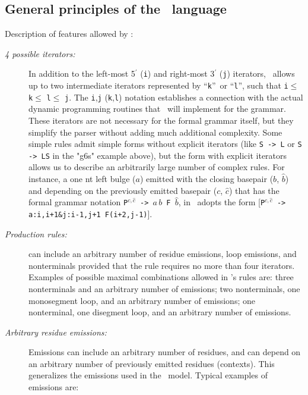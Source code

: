 \subsection{General principles of the \tornado\, language}
Description of features allowed by \tornado:
%
\begin{description}

\item[\textsl{4 possible iterators:}] In addition to the left-most
  5$^\prime$ (\texttt{i}) and right-most 3$^\prime$ (\texttt{j})
  iterators, \tornado\, allows up to two intermediate iterators
  represented by ``\texttt{k}''\, or ``\texttt{l}'', such that
  \texttt{i}$\leq$ \texttt{k}$\leq$ \texttt{l}$\leq$ \texttt{j}.  The
  \texttt{i},\texttt{j} (\texttt{k},\texttt{l}) notation establishes a
  connection with the actual dynamic programming routines that
  \tornado\, will implement for the grammar. These iterators are not
  necessary for the formal grammar itself, but they simplify the
  parser without adding much additional complexity. Some simple rules
  admit simple forms without explicit iterators (like \texttt{S -> L}
  or \texttt{S -> LS} in the "g6s" example above), but the form with
  explicit iterators allows us to describe an arbitrarily large number
  of complex rules. For instance, a one nt left bulge ($a$) emitted
  with the closing basepair ($b$, $\hat b$) and depending on the
  previously emitted basepair ($c$, $\hat c$) that has the formal
  grammar notation \texttt{P$^{c, \hat c}$ -> $a\, b$ F $\hat b$}, in
  \tornado\, adopts the form [\texttt{P$^{c, \hat c}$ ->
      a:i,i+1\&j:i-1,j+1 F(i+2,j-1)}].

\item[\textsl{Production rules:}] can include an arbitrary number of
  residue emissions, loop emissions, and nonterminals provided that
  the rule requires no more than four iterators. Examples of possible
  maximal combinations allowed in \tornado's rules are: three
  nonterminals and an arbitrary number of emissions; two nonterminals,
  one monosegment loop, and an arbitrary number of emissions; one
  nonterminal, one disegment loop, and an arbitrary number of
  emissions.

\item[\textsl{Arbitrary residue emissions:}] Emissions can include an
  arbitrary number of residues, and can depend on an arbitrary number
  of previously emitted residues (contexts). This generalizes the
  emissions used in the \nn\, model. Typical examples of \nn\,
  emissions are:


\end{description}
